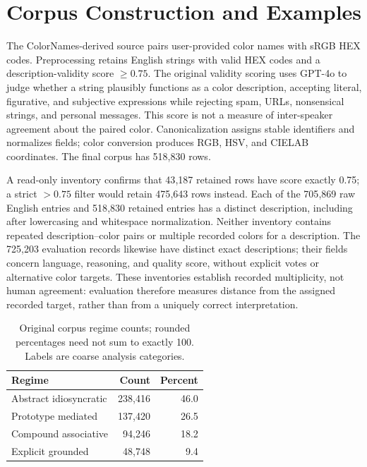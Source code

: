 \section{Corpus Construction and Examples}
\label{sec:appendix-dataset}
\label{app:corpus-examples}

The ColorNames-derived source pairs user-provided color names with sRGB HEX
codes. Preprocessing retains English strings with valid HEX codes and a
description-validity score $\geq 0.75$. The original validity scoring
uses GPT-4o to judge whether a string plausibly functions as a color description,
accepting literal, figurative, and subjective expressions while rejecting
spam, URLs, nonsensical strings, and personal messages. This score is not
a measure of inter-speaker agreement about the paired color. Canonicalization
assigns stable identifiers and normalizes fields; color conversion produces
RGB, HSV, and CIELAB coordinates. The final corpus has 518{,}830 rows.

A read-only inventory confirms that 43{,}187 retained rows have score exactly
0.75; a strict $>0.75$ filter would retain 475{,}643 rows instead.
Each of the 705{,}869 raw English entries and 518{,}830 retained entries has
a distinct description, including after lowercasing and whitespace
normalization. Neither inventory contains repeated description--color pairs
or multiple recorded colors for a description. The 725{,}203 evaluation
records likewise have distinct exact descriptions; their fields concern
language, reasoning, and quality score, without explicit votes or alternative
color targets. These inventories establish recorded multiplicity, not human
agreement: evaluation therefore measures distance from the assigned recorded
target, rather than from a uniquely correct interpretation.

\begin{table}[H]
\centering\small
\begin{tabular}{@{}lrr@{}}
\toprule
Regime & Count & Percent \\
\midrule
Abstract idiosyncratic & 238{,}416 & 46.0 \\
Prototype mediated & 137{,}420 & 26.5 \\
Compound associative & 94{,}246 & 18.2 \\
Explicit grounded & 48{,}748 & 9.4 \\
\bottomrule
\end{tabular}
\caption{Original corpus regime counts; rounded percentages need not sum
to exactly 100. Labels are coarse analysis categories.}
\end{table}


